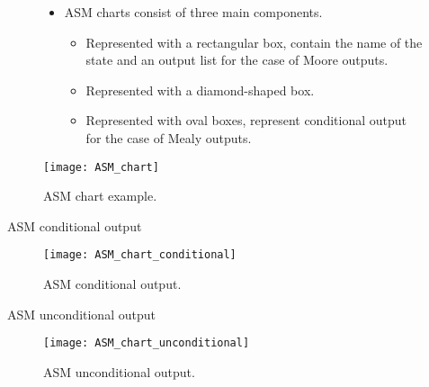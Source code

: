 % 
\begin{frame}{}{}
\begin{figure}
\begin{minipage}[b]{0.5\linewidth}
  \begin{itemize}
    \item \ac{ASM} charts consist of three main components.
    \begin{itemize}
      \item {} Represented with a rectangular box,  contain the name of the state and an output list for the case of Moore outputs.
      \item {} Represented with a diamond-shaped box.
      \item {} Represented with oval boxes, represent conditional output for the case of Mealy outputs.
    \end{itemize}
  \end{itemize}
\end{minipage}
%
\begin{minipage}[b]{0.49\linewidth}
\centering
  \texttt{[image: ASM\_chart]}
  \vspace{-4pt}
  \caption{\ac{ASM} chart example.}
  \label{Figure:ASM_chart}
\end{minipage}
\end{figure}
\end{frame}

% 
\begin{frame}{ASM conditional output}{}
  \begin{figure}
  \centering
  \texttt{[image: ASM\_chart\_conditional]}
  \vspace{-4pt}
  \caption{\ac{ASM} conditional output.}
  \label{Figure:ASM_conditional}
  \end{figure}
\end{frame}


% 
\begin{frame}{ASM unconditional output}{}
  \begin{figure}
  \centering
  \texttt{[image: ASM\_chart\_unconditional]}
  \vspace{-4pt}
  \caption{\ac{ASM} unconditional output.}
  \label{Figure:ASM_unconditional}
  \end{figure}
\end{frame}